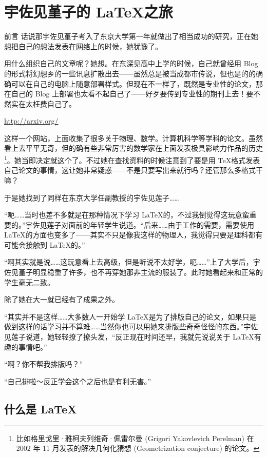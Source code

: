 \chapter[宇佐见堇子的 \LaTeX 之旅]{宇佐见堇子的 \LaTeX 之旅}
\label{cp:宇佐见堇子的 LaTeX 之旅}

\begin{prologuebox}{前言}
    话说那宇佐见堇子考入了东京大学第一年就做出了相当成功的研究，正在她想把自己的想法发表在网络上的时候，她犹豫了。

    用什么组织自己的文章呢？她想。在东深见高中上学的时候，自己就曾经用 Blog 的形式将幻想乡的一些讯息扩散出去——虽然总是被当成都市传说，但也是的的确确可以在自己的电脑上随意部署样式。但现在不一样了，既然是专业性的论文，那在自己的 Blog 上部署也太看不起自己了——好歹要传到专业性的期刊上去！要不然实在太枉费自己了。

    \url{http://arxiv.org/}

    这样一个网站，上面收集了很多关于物理、数学。计算机科学等学科的论文。虽然看上去平平无奇，但的确有些非常厉害的数学家在上面发表极具影响力作品的历史\footnote{比如格里戈里·雅柯夫列维奇·佩雷尔曼 (Grigori Yakovlevich Perelman) 在 2002 年 11 月发表的解决几何化猜想 (Geometrization conjecture) 的论文。}。她当即决定就这个了。不过她在查找资料的时候注意到了要是用 \TeX 格式发表自己论文的事情，这让她非常疑惑——不是只要写出来就行吗？还管那么多格式干嘛？

    于是她找到了同样在东京大学任副教授的宇佐见莲子……
\end{prologuebox}

“呃……当时也差不多就是在那种情况下学习 \LaTeX 的，不过我倒觉得这玩意蛮重要的。”宇佐见莲子对面前的年轻学生说道。“后来……由于工作的需要，需要使用 \LaTeX 的方面也变多了——其实不只是像我这样的物理人，我觉得只要是理科都有可能会接触到 \LaTeX 的。”

“啊其实就是说……这玩意看上去高级，但是听说不太好学，呃……”上了大学后，宇佐见堇子明显稳重了许多，也不再穿她那非主流的服装了。此时她看起来和正常的学生毫无二致。

除了她在大一就已经有了成果之外。

“其实并不是这样……大多数人一开始学 \LaTeX 是为了排版自己的论文，如果只是做到这样的话学习并不算难……当然你也可以用她来排版些奇奇怪怪的东西。”宇佐见莲子说道，她轻轻撩了撩头发，“反正现在时间还早，我就先说说关于 \LaTeX 有趣的事情吧。”

“啊？你不帮我排版吗？”

“自己排啦～反正学会这个之后也是有利无害。”

\section{什么是 \LaTeX}

